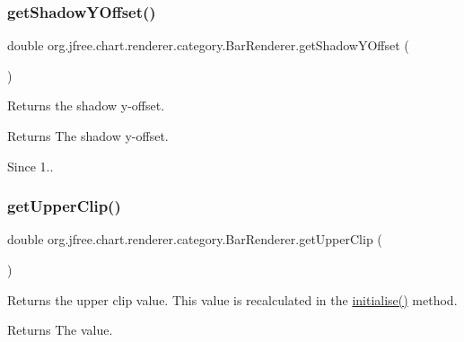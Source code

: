 \subsubsection{\texorpdfstring{get\+Shadow\+Y\+Offset()}{getShadowYOffset()}}
{\footnotesize\ttfamily double org.\+jfree.\+chart.\+renderer.\+category.\+Bar\+Renderer.\+get\+Shadow\+Y\+Offset (\begin{DoxyParamCaption}{ }\end{DoxyParamCaption})}

Returns the shadow y-\/offset.

\begin{DoxyReturn}{Returns}
The shadow y-\/offset.
\end{DoxyReturn}
\begin{DoxySince}{Since}
1.. 
\end{DoxySince}
\mbox{\label{classorg_1_1jfree_1_1chart_1_1renderer_1_1category_1_1_bar_renderer_aa69a33346be9475b2d873db59f31ad7e}} 
\subsubsection{\texorpdfstring{get\+Upper\+Clip()}{getUpperClip()}}
{\footnotesize\ttfamily double org.\+jfree.\+chart.\+renderer.\+category.\+Bar\+Renderer.\+get\+Upper\+Clip (\begin{DoxyParamCaption}{ }\end{DoxyParamCaption})}

Returns the upper clip value. This value is recalculated in the \mbox{\hyperlink{classorg_1_1jfree_1_1chart_1_1renderer_1_1category_1_1_bar_renderer_a6e4d149cf05c5661c9b6d2d748ceba36}{initialise()}} method.

\begin{DoxyReturn}{Returns}
The value. 
\end{DoxyReturn}
\mbox{\label{classorg_1_1jfree_1_1chart_1_1renderer_1_1category_1_1_bar_renderer_a6e4d149cf05c5661c9b6d2d748ceba36}} 
